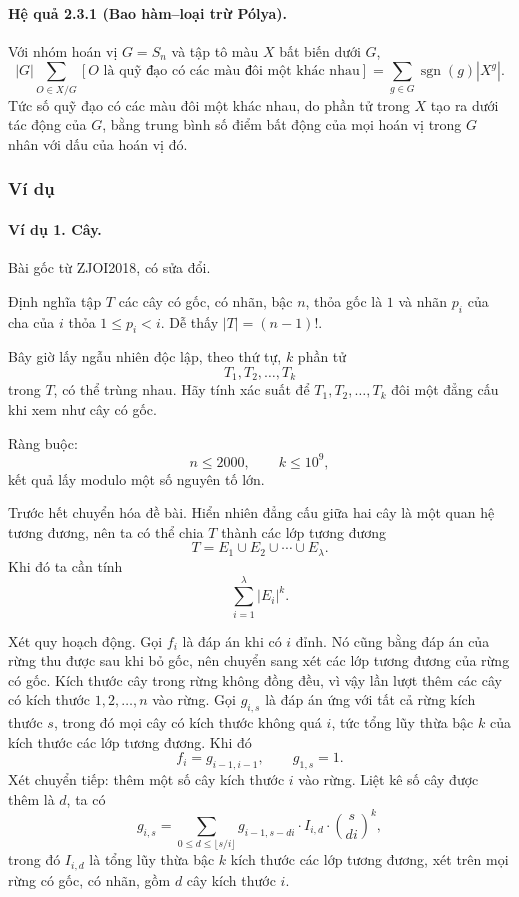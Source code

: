 \documentclass[11pt]{article}
\begin{document}
\paragraph{Hệ quả 2.3.1 (Bao hàm--loại trừ Pólya).}
Với nhóm hoán vị \(G=S_n\) và tập tô màu \(X\) bất biến dưới \(G\),
\[
  |G|\sum_{O\in X/G} [O\text{ là quỹ đạo có các màu đôi một khác nhau}]
  =
  \sum_{g\in G}\operatorname{sgn}(g)|X^g|.
\]
Tức số quỹ đạo có các màu đôi một khác nhau, do phần tử trong \(X\) tạo ra dưới
tác động của \(G\), bằng trung bình số điểm bất động của mọi hoán vị trong
\(G\) nhân với dấu của hoán vị đó.

\subsubsection{Ví dụ}

\paragraph{Ví dụ 1. Cây.}
Bài gốc từ ZJOI2018, có sửa đổi.

Định nghĩa tập \(T\) các cây có gốc, có nhãn, bậc \(n\), thỏa gốc là \(1\) và
nhãn \(p_i\) của cha của \(i\) thỏa \(1\le p_i<i\). Dễ thấy
\(|T|=(n-1)!\).

Bây giờ lấy ngẫu nhiên độc lập, theo thứ tự, \(k\) phần tử
\[
  T_1,T_2,\ldots,T_k
\]
trong \(T\), có thể trùng nhau. Hãy tính xác suất để
\(T_1,T_2,\ldots,T_k\) đôi một đẳng cấu khi xem như cây có gốc.

Ràng buộc:
\[
  n\le 2000,\qquad k\le 10^9,
\]
kết quả lấy modulo một số nguyên tố lớn.

Trước hết chuyển hóa đề bài. Hiển nhiên đẳng cấu giữa hai cây là một quan hệ
tương đương, nên ta có thể chia \(T\) thành các lớp tương đương
\[
  T=E_1\cup E_2\cup\cdots\cup E_\lambda.
\]
Khi đó ta cần tính
\[
  \sum_{i=1}^{\lambda}|E_i|^k.
\]

Xét quy hoạch động. Gọi \(f_i\) là đáp án khi có \(i\) đỉnh. Nó cũng bằng đáp
án của rừng thu được sau khi bỏ gốc, nên chuyển sang xét các lớp tương đương
của rừng có gốc. Kích thước cây trong rừng không đồng đều, vì vậy lần lượt
thêm các cây có kích thước \(1,2,\ldots,n\) vào rừng. Gọi \(g_{i,s}\) là đáp án
ứng với tất cả rừng kích thước \(s\), trong đó mọi cây có kích thước không quá
\(i\), tức tổng lũy thừa bậc \(k\) của kích thước các lớp tương đương. Khi đó
\[
  f_i=g_{i-1,i-1},\qquad g_{1,s}=1.
\]
Xét chuyển tiếp: thêm một số cây kích thước \(i\) vào rừng. Liệt kê số cây
được thêm là \(d\), ta có
\[
  g_{i,s}=
  \sum_{0\le d\le \lfloor s/i\rfloor}
  g_{i-1,s-di}\cdot I_{i,d}\cdot
  \binom{s}{di}^{k},
\]
trong đó \(I_{i,d}\) là tổng lũy thừa bậc \(k\) kích thước các lớp tương đương,
xét trên mọi rừng có gốc, có nhãn, gồm \(d\) cây kích thước \(i\).
\end{document}
